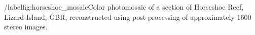 /label{fig:horseshoe_mosaic}Color photomosaic of a section of Horseshoe Reef, Lizard Island, GBR, reconstructed using post-processing of approximately 1600 stereo images.